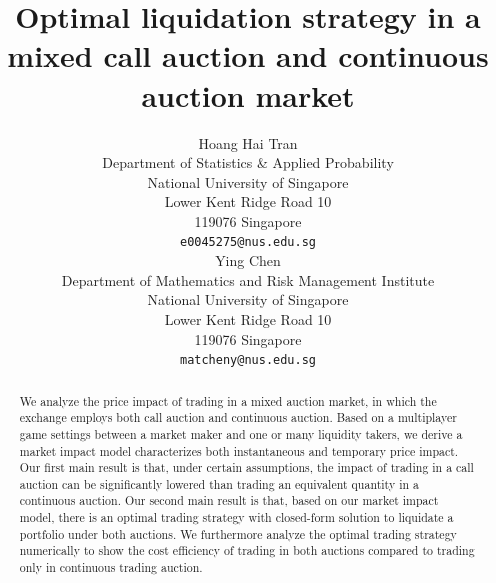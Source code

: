 \documentclass{article}
\title{Optimal liquidation strategy in a mixed call auction and continuous auction market}
\author{
 Hoang Hai Tran\\
 Department of Statistics \& Applied Probability\\
 National University of Singapore \\
 Lower Kent Ridge Road 10 \\
 119076 Singapore \\
 \texttt{e0045275@nus.edu.sg} \\
   \And
 Ying Chen\\
 Department of Mathematics and Risk Management Institute \\
 National University of Singapore \\
 Lower Kent Ridge Road 10 \\
 119076 Singapore \\
 \texttt{matcheny@nus.edu.sg} \\
}
\begin{document}
\maketitle

\begin{abstract}
  We analyze the price impact of trading in a mixed auction market, in which the exchange employs both call auction and continuous auction. Based on a multiplayer game settings between a market maker and one or many liquidity takers, we derive a market impact model characterizes both instantaneous and temporary price impact. Our first main result is that, under certain assumptions, the impact of trading in a call auction can be significantly lowered than trading an equivalent quantity in a continuous auction. Our second main result is that, based on our market impact model, there is an optimal trading strategy with closed-form solution to liquidate a portfolio under both auctions. We furthermore analyze the optimal trading strategy numerically to show the cost efficiency of trading in both auctions compared to trading only in continuous trading auction.
\end{abstract}
\end{document}
